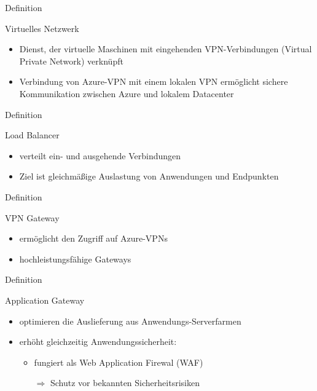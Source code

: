 \documentclass{scrartcl}
\newenvironment{flashcard}[2][]{%
    #1
    \vfill
    \centerline{\Large{#2}}
    \vfill
\newpage
}
{\newpage}
\begin{document}
    \begin{flashcard}[Definition]{Virtuelles Netzwerk}
        \begin{itemize}
            \item Dienst, der virtuelle Maschinen mit eingehenden VPN-Verbindungen (Virtual Private Network) verknüpft
            \item Verbindung von Azure-VPN mit einem lokalen VPN ermöglicht sichere Kommunikation zwischen Azure und lokalem Datacenter
        \end{itemize}

    \end{flashcard}

    \begin{flashcard}[Definition]{Load Balancer}
        \begin{itemize}
            \item verteilt ein- und ausgehende Verbindungen
            \item Ziel ist gleichmäßige Auslastung von Anwendungen und Endpunkten
        \end{itemize}

    \end{flashcard}

    \begin{flashcard}[Definition]{VPN Gateway}
        \begin{itemize}
            \item ermöglicht den Zugriff auf Azure-VPNs
            \item hochleistungsfähige Gateways
        \end{itemize}

    \end{flashcard}

    \begin{flashcard}[Definition]{Application Gateway}
        \begin{itemize}
            \item optimieren die Auslieferung aus Anwendungs-Serverfarmen
            \item erhöht gleichzeitig Anwendungssicherheit:
            \begin{itemize}
                \item fungiert als Web Application Firewal (WAF)
                \item[$\Rightarrow$] Schutz vor bekannten Sicherheitsrisiken
            \end{itemize}
        \end{itemize}

    \end{flashcard}
\end{document}
